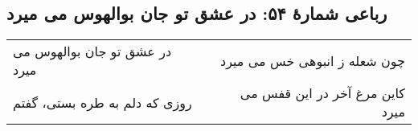 \begin{center}
\section*{رباعی شمارهٔ ۵۴: در عشق تو جان بوالهوس می میرد}
\label{sec:054}
\begin{longtable}{l p{0.5cm} r}
در عشق تو جان بوالهوس می میرد
&&
چون شعله ز انبوهی خس می میرد
\\
روزی که دلم به طره بستی، گفتم
&&
کاین مرغ آخر در این قفس می میرد
\\
\end{longtable}
\end{center}
